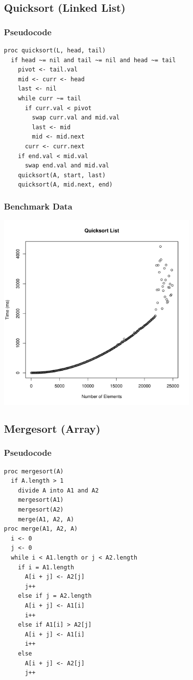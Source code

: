 \documentclass[a4paper,12pt]{article}
\begin{document}
\subsection{Quicksort (Linked List)}
\subsubsection{Pseudocode}
\begin{verbatim}
proc quicksort(L, head, tail)
  if head ~= nil and tail ~= nil and head ~= tail
    pivot <- tail.val
    mid <- curr <- head
    last <- nil
    while curr ~= tail
      if curr.val < pivot
        swap curr.val and mid.val
        last <- mid
        mid <- mid.next
      curr <- curr.next
    if end.val < mid.val
      swap end.val and mid.val
    quicksort(A, start, last)
    quicksort(A, mid.next, end)
\end{verbatim}
\subsubsection{Benchmark Data}
\includegraphics[height=10cm]{quicksort_list}
\subsection{Mergesort (Array)}
\subsubsection{Pseudocode}
\begin{verbatim}
proc mergesort(A)
  if A.length > 1
    divide A into A1 and A2
    mergesort(A1)
    mergesort(A2)
    merge(A1, A2, A)
proc merge(A1, A2, A)
  i <- 0
  j <- 0
  while i < A1.length or j < A2.length
    if i = A1.length
      A[i + j] <- A2[j]
      j++
    else if j = A2.length
      A[i + j] <- A1[i]
      i++
    else if A1[i] > A2[j]
      A[i + j] <- A1[i]
      i++
    else 
      A[i + j] <- A2[j]
      j++     
\end{verbatim}
\end{document}
